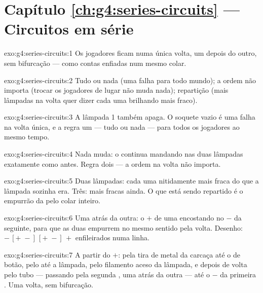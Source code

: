 \section*{Capítulo \ref{ch:g4:series-circuits} --- Circuitos em série}

\begin{solution}{exo:g4:series-circuits:1}
Os jogadores ficam numa única volta, um depois do outro, sem
bifurcação --- como contas enfiadas num mesmo colar.
\end{solution}

\begin{solution}{exo:g4:series-circuits:2}
Tudo ou nada (uma falha para todo mundo); a ordem não importa (trocar
os jogadores de lugar não muda nada); repartição (mais lâmpadas na
volta quer dizer cada uma brilhando mais fraco).
\end{solution}

\begin{solution}{exo:g4:series-circuits:3}
A lâmpada 1 também apaga. O soquete vazio é uma falha na volta única,
e a regra um --- tudo ou nada --- para todos os jogadores ao mesmo
tempo.
\end{solution}

\begin{solution}{exo:g4:series-circuits:4}
Nada muda: o  continua mandando nas duas lâmpadas
exatamente como antes. Regra dois --- a ordem na volta não importa.
\end{solution}

\begin{solution}{exo:g4:series-circuits:5}
Duas lâmpadas: cada uma nitidamente mais fraca do que a lâmpada
sozinha era. Três: mais fracas ainda. O que está sendo repartido é o
empurrão da  pelo colar inteiro.
\end{solution}

\begin{solution}{exo:g4:series-circuits:6}
Uma atrás da outra: o $+$ de uma encostando no $-$ da seguinte, para
que as duas empurrem no mesmo sentido pela volta. Desenho:
$-\,[{+}\;{-}]\,[{+}\;{-}]\,+$ enfileirados numa linha.
\end{solution}

\begin{solution}{exo:g4:series-circuits:7}
A partir do $+$: pela tira de metal da carcaça até o  de
botão, pelo  até a lâmpada, pelo filamento aceso da
lâmpada, e depois de volta pelo tubo --- passando pela segunda ,
uma atrás da outra --- até o $-$ da primeira . Uma volta, sem
bifurcação.
\end{solution}

